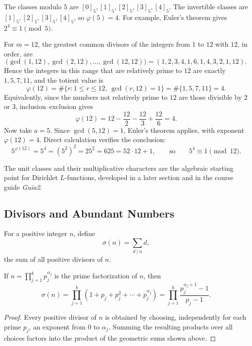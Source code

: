 \begin{example}
The classes modulo $5$ are $[0]_5,[1]_5,[2]_5,[3]_5,[4]_5$. The invertible classes are $[1]_5,[2]_5,[3]_5,[4]_5$, so $\varphi(5)=4$. For example, Euler's theorem gives $2^4\equiv1\pmod5$.
\end{example}

\begin{example}
For $m=12$, the greatest common divisors of the integers from $1$ to $12$ with $12$, in order, are
\[
 \bigl(\gcd(1,12),\gcd(2,12),\ldots,\gcd(12,12)\bigr)
 =(1,2,3,4,1,6,1,4,3,2,1,12).
\]
Hence the integers in this range that are relatively prime to $12$ are exactly $1,5,7,11$, and the totient value is
\[
 \varphi(12)=\#\{r:1\leq r\leq12,\ \gcd(r,12)=1\}
 =\#\{1,5,7,11\}=4.
\]
Equivalently, since the numbers not relatively prime to $12$ are those divisible by $2$ or $3$, inclusion--exclusion gives
\[
 \varphi(12)=12-\frac{12}{2}-\frac{12}{3}+\frac{12}{6}=4.
\]
Now take $a=5$. Since $\gcd(5,12)=1$, Euler's theorem applies, with exponent $\varphi(12)=4$. Direct calculation verifies the conclusion:
\[
 5^{\varphi(12)}=5^4=(5^2)^2=25^2=625=52\cdot12+1,
 \qquad\text{so}\qquad 5^4\equiv1\pmod{12}.
\]
\end{example}

The unit classes and their multiplicative characters are the algebraic starting point for Dirichlet $L$-functions, developed in a later section and in the course guide \textit{Guia2}.

\subsection{Divisors and Abundant Numbers}

\begin{definition}
For a positive integer $n$, define
\[
 \sigma(n)=\sum_{d\mid n}d,
\]
the sum of all positive divisors of $n$.
\end{definition}

\begin{theorem}
If $n=\prod_{j=1}^{k}p_j^{\alpha_j}$ is the prime factorization of $n$, then
\[
 \sigma(n)=\prod_{j=1}^{k}\left(1+p_j+p_j^2+\cdots+p_j^{\alpha_j}\right)
 =\prod_{j=1}^{k}\frac{p_j^{\alpha_j+1}-1}{p_j-1}.
\]
\end{theorem}

\begin{proof}
Every positive divisor of $n$ is obtained by choosing, independently for each prime $p_j$, an exponent from $0$ to $\alpha_j$. Summing the resulting products over all choices factors into the product of the geometric sums shown above.
\end{proof}

